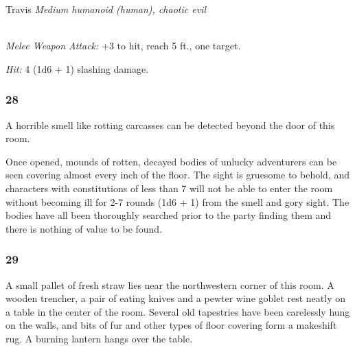 \documentclass[palace_of_the_silver_princess]{subfiles}
\begin{document}
\begin{monsterbox}{Travis}
    \textit{Medium humanoid (human), chaotic evil}\\
    \hline
    \basics[%
        armorclass = 12,
        hitpoints  = 11 (2d8 + 2),
        speed      = {30 ft.}
    ]
    \hline
    \stats[
        STR = \stat{11},
        DEX = \stat{12},
        CON = \stat{12},
        INT = \stat{10},
        WIS = \stat{10},
        CHA = \stat{10}
    ]
    \hline
    \details[
        senses = {passive Perception 10},
        languages = {Common},
        challenge = {1/8 (25 XP)},
    ]
    \hline
    \\[1mm]
    \begin{monsteraction}
        \textit{Melee Weapon Attack:} +3 to hit, reach 5 ft., one
        target.

        \textit{Hit:} 4 (1d6 + 1) slashing damage.
    \end{monsteraction}
\end{monsterbox}

\subsubsection{28}
\begin{quotebox}
    A horrible smell like rotting carcasses can be detected beyond the
    door of this room.
\end{quotebox}

Once opened, mounds of rotten, decayed bodies of unlucky adventurers can
be seen covering almost every inch of the floor. The sight is gruesome
to behold, and characters with constitutions of less than 7 will not be
able to enter the room without becoming ill for 2-7 rounds (1d6 + 1)
from the smell and gory sight. The bodies have all been thoroughly
searched prior to the party finding them and there is nothing of value
to be found.

\subsubsection{29}
\begin{quotebox}
    A small pallet of fresh straw lies near the northwestern corner of
    this room. A wooden trencher, a pair of eating knives and a pewter
    wine goblet rest neatly on a table in the center of the room.
    Several old tapestries have been carelessly hung on the walls, and
    bits of fur and other types of floor covering form a makeshift
    rug. A burning lantern hangs over the table.
\end{quotebox}
\end{document}
